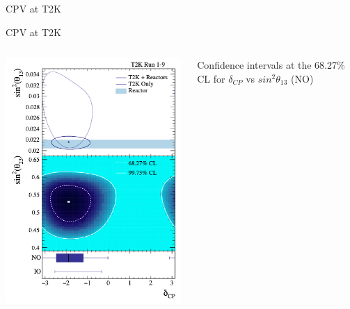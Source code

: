 \begin{frame}{CPV at T2K}
\end{frame}

%
%
%

\begin{frame}[t]{CPV at T2K}

  \begin{columns}[T]
    \begin{column}{0.40\textwidth}
      \begin{center}
         \includegraphics[width=0.99\textwidth]{./images/3nu/accelerator/t2k_cpv_2019}\\
      \end{center}
    \end{column}
    \begin{column}{0.60\textwidth}
      \begin{itemize}
        {\small
        \item Confidence intervals at the 68.27\% CL for $\delta_{CP}$ vs $sin^{2}\theta_{13}$ (NO)
}
\end{itemize}
\end{column}
\end{columns}
\end{frame}
